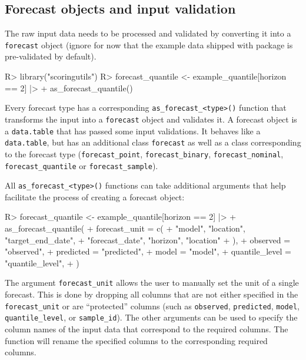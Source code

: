 \documentclass[
]{jss}
\begin{document}
\subsection{Forecast objects and input validation} \label{sec:validation}

The raw input data needs to be processed and validated by converting it
into a \texttt{forecast} object (ignore for now that the example data
shipped with package is pre-validated by default).

\begin{CodeChunk}
\begin{CodeInput}
R> library("scoringutils")
R> forecast_quantile <- example_quantile[horizon == 2] |>
+   as_forecast_quantile() 
\end{CodeInput}
\end{CodeChunk}

Every forecast type has a corresponding
\texttt{as\_forecast\_\textless{}type\textgreater{}()} function that
transforms the input into a \texttt{forecast} object and validates it. A
forecast object is a \texttt{data.table} that has passed some input
validations. It behaves like a \texttt{data.table}, but has an
additional class \texttt{forecast} as well as a class corresponding to
the forecast type (\texttt{forecast\_point}, \texttt{forecast\_binary},
\texttt{forecast\_nominal}, \texttt{forecast\_quantile} or
\texttt{forecast\_sample}).

All \texttt{as\_forecast\_\textless{}type\textgreater{}()} functions can
take additional arguments that help facilitate the process of creating a
forecast object:

\begin{CodeChunk}
\begin{CodeInput}
R> forecast_quantile <- example_quantile[horizon == 2] |>
+   as_forecast_quantile(
+     forecast_unit = c(
+       "model", "location", "target_end_date", 
+       "forecast_date", "horizon", "location"
+     ),
+     observed = "observed", 
+     predicted = "predicted",
+     model = "model",
+     quantile_level = "quantile_level",
+   ) 
\end{CodeInput}
\end{CodeChunk}

The argument \texttt{forecast\_unit} allows the user to manually set the
unit of a single forecast. This is done by dropping all columns that are
not either specified in the \texttt{forecast\_unit} or are ``protected''
columns (such as \texttt{observed}, \texttt{predicted}, \texttt{model},
\texttt{quantile\_level}, or \texttt{sample\_id}). The other arguments
can be used to specify the column names of the input data that
correspond to the required columns. The function will rename the
specified columns to the corresponding required columns.
\end{document}

